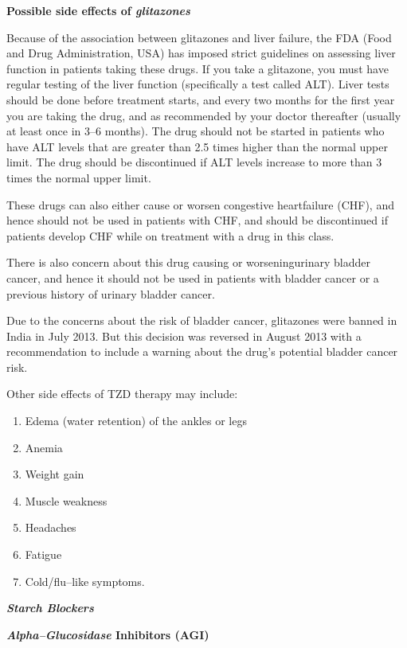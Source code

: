 \noindent\textbf{Possible side effects of \textit{glitazones}}

Because of the association between glitazones and liver failure, the FDA (Food and Drug Administration, USA) has imposed strict guidelines on assessing liver function in patients taking these drugs. If you take a glitazone, you must have regular testing of the liver function (specifically a test called ALT). Liver tests should be done before treatment starts, and every two months for the first year you are taking the drug, and as recommended by your doctor thereafter (usually at least once in 3–6 months). The drug should not be started in patients who have ALT levels that are greater than 2.5 times higher than the normal upper limit. The drug should be discontinued if ALT levels increase to more than 3 times the normal upper limit.

These drugs can also either cause or worsen congestive heart\break failure (CHF), and hence should not be used in patients with CHF, and should be discontinued if patients develop CHF while on treatment with a drug in this class.

There is also concern about this drug causing or worsening\break urinary bladder cancer, and hence it should not be used in patients with bladder cancer or a previous history of urinary bladder cancer.

Due to the concerns about the risk of bladder cancer, glitazones were banned in India in July 2013. But this decision was reversed in August 2013 with a recommendation to include a warning about the drug’s potential bladder cancer risk.

\noindent Other side effects of TZD therapy may include:

\begin{enumerate}[•]
\itemsep=0pt
\item Edema (water retention) of the ankles or legs
\item Anemia
\item Weight gain
\item Muscle weakness
\item Headaches
\item Fatigue
\item Cold/flu–like symptoms.
\end{enumerate}

\textbf{\textit{Starch Blockers}}

\textbf{\textit{Alpha–Glucosidase} Inhibitors (AGI)}

